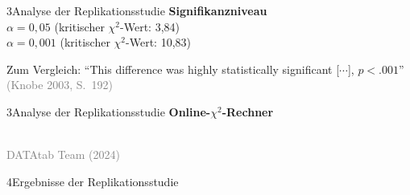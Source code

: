 \documentclass[xcolor=table,9pt,aspectratio=169]{beamer}
\begin{document}
\begin{frame}{\vspace*{10mm}3\hspace*{1em}Analyse der Replikationsstudie}
\textbf{Signifikanzniveau}\\
\smallskip
$\alpha=0,05$ (kritischer $\chi^{2}$-Wert: 3,84)\\
\smallskip
$\alpha=0,001$ (kritischer $\chi^{2}$-Wert: 10,83)

\bigskip
Zum Vergleich: \enquote{This difference was highly statistically significant [$\cdots$], $p<.001$}\\
\textcolor{gray}{(Knobe 2003, S.~192)}

\end{frame}


\begin{frame}{\vspace*{10mm}3\hspace*{1em}Analyse der Replikationsstudie}
\textbf{Online-$\chi^{2}$-Rechner}\\
\begin{center}
   \\
   \textcolor{gray}{DATAtab Team (2024)}
\end{center}
\end{frame}


\begin{frame}
\begin{overlayarea}{\textwidth}{0.81\paperheight}{
   \vspace*{11mm}
   \textcolor{uolblue}
   {4\hspace*{1em}Ergebnisse der Replikationsstudie}
}
\end{overlayarea}
\end{frame}
\end{document}
